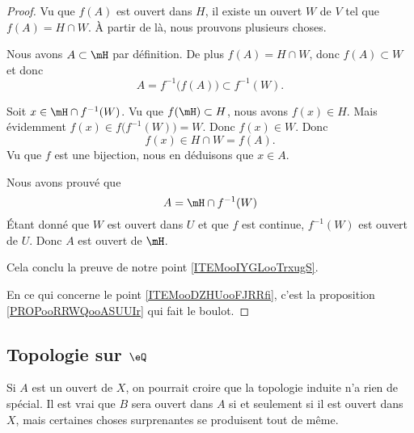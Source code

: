 \begin{proof}
	Vu que \( f(A)\) est ouvert dans \( H\), il existe un ouvert \( W\) de \( V\) tel que \( f(A)=H\cap W\). À partir de là, nous prouvons plusieurs choses.
	\begin{subproof}
		Nous avons \( A\subset\mH\) par définition. De plus \( f(A)=H\cap W\), donc \( f(A)\subset W\) et donc
		\begin{equation}
			A=f^{-1}\big( f(A) \big)\subset f^{-1}(W).
		\end{equation}

		Soit \( x\in \mH\cap f^{-1}(W)\). Vu que \( f(\mH)\subset H\), nous avons \( f(x)\in H\). Mais évidemment \( f(x)\in f\big( f^{-1}(W) \big)=W\). Donc \( f(x)\in W\). Donc
		\begin{equation}
			f(x)\in H\cap W=f(A).
		\end{equation}
		Vu que \( f\) est une bijection, nous en déduisons que \( x\in A\).

		\spitem[Conclusion]
		Nous avons prouvé que
		\begin{equation}
			A= \mH\cap f^{-1}(W)
		\end{equation}
		Étant donné que \( W\) est ouvert dans \( U\) et que \( f\) est continue, \( f^{-1}(W)\) est ouvert de \( U\). Donc \( A\) est ouvert de \( \mH\).

		Cela conclu la preuve de notre point \ref{ITEMooIYGLooTrxugS}.
	\end{subproof}
	En ce qui concerne le point \ref{ITEMooDZHUooFJRRfi}, c'est la proposition \ref{PROPooRRWQooASUUIr} qui fait le boulot.
\end{proof}


\subsection{Topologie sur \( \eQ\)}

Si \( A\) est un ouvert de \( X\), on pourrait croire que la topologie induite n'a rien de spécial. Il est vrai que \( B\) sera ouvert dans \( A\) si et seulement si il est ouvert dans \( X\), mais certaines choses surprenantes se produisent tout de même.

